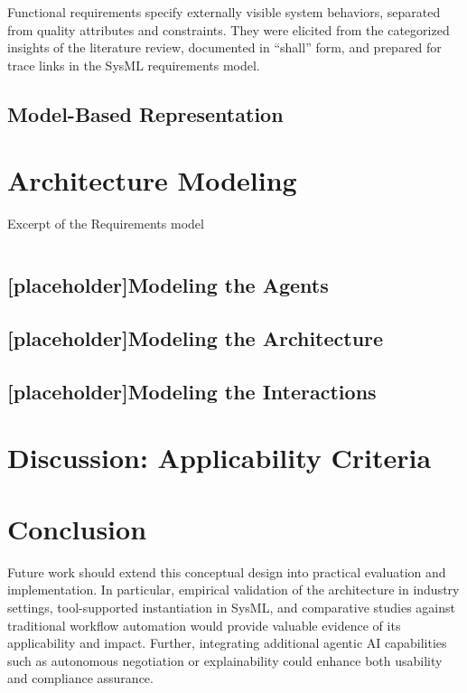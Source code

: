 Functional requirements specify externally visible system behaviors, separated from quality attributes and constraints. They were elicited from the categorized insights of the literature review, documented in “shall” form, and prepared for trace links in the SysML requirements model. \\

\subsection{Model-Based Representation}\label{subsec:req-model}

\section{Architecture Modeling}\label{sec:mod-mas}
\begin{listing}[h]
    \caption{Excerpt of the Requirements model}
    \inputminted[firstline=1,lastline=25]{text}{ressources/models/requirements.sysml}
\end{listing}
\subsection{[placeholder]Modeling the Agents}\label{subsec:mod-agents}
\subsection{[placeholder]Modeling the Architecture}\label{subsec:mod-arch}
\subsection{[placeholder]Modeling the Interactions}\label{subsec:mod-interactions}

\section{Discussion: Applicability Criteria}\label{sec:discussion}
    
\section{Conclusion}\label{sec:conclussion}
Future work should extend this conceptual design into practical evaluation and implementation. In particular, empirical validation of the architecture in industry settings, tool-supported instantiation in SysML, and comparative studies against traditional workflow automation would provide valuable evidence of its applicability and impact. Further, integrating additional agentic AI capabilities such as autonomous negotiation or explainability could enhance both usability and compliance assurance.
\clearpage